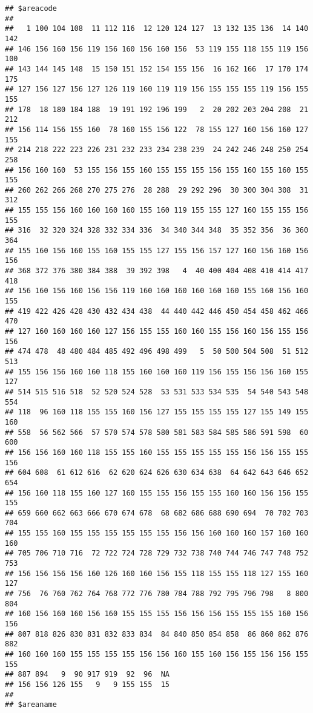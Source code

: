 \documentclass[]{article}
\begin{document}
\begin{verbatim}
## $areacode
## 
##   1 100 104 108  11 112 116  12 120 124 127  13 132 135 136  14 140 142 
## 146 156 160 156 119 156 160 156 160 156  53 119 155 118 155 119 156 100 
## 143 144 145 148  15 150 151 152 154 155 156  16 162 166  17 170 174 175 
## 127 156 127 156 127 126 119 160 119 119 156 155 155 155 119 156 155 155 
## 178  18 180 184 188  19 191 192 196 199   2  20 202 203 204 208  21 212 
## 156 114 156 155 160  78 160 155 156 122  78 155 127 160 156 160 127 155 
## 214 218 222 223 226 231 232 233 234 238 239  24 242 246 248 250 254 258 
## 156 160 160  53 155 156 155 160 155 155 155 156 155 160 155 160 155 155 
## 260 262 266 268 270 275 276  28 288  29 292 296  30 300 304 308  31 312 
## 155 155 156 160 160 160 160 155 160 119 155 155 127 160 155 155 156 155 
## 316  32 320 324 328 332 334 336  34 340 344 348  35 352 356  36 360 364 
## 155 160 156 160 155 160 155 155 127 155 156 157 127 160 156 160 156 156 
## 368 372 376 380 384 388  39 392 398   4  40 400 404 408 410 414 417 418 
## 156 160 156 160 156 156 119 160 160 160 160 160 160 155 160 156 160 155 
## 419 422 426 428 430 432 434 438  44 440 442 446 450 454 458 462 466 470 
## 127 160 160 160 160 127 156 155 155 160 160 155 156 160 156 155 156 156 
## 474 478  48 480 484 485 492 496 498 499   5  50 500 504 508  51 512 513 
## 155 156 156 160 160 118 155 160 160 160 119 156 155 156 156 160 155 127 
## 514 515 516 518  52 520 524 528  53 531 533 534 535  54 540 543 548 554 
## 118  96 160 118 155 155 160 156 127 155 155 155 155 127 155 149 155 160 
## 558  56 562 566  57 570 574 578 580 581 583 584 585 586 591 598  60 600 
## 156 156 160 160 118 155 155 160 155 155 155 155 155 156 156 155 155 156 
## 604 608  61 612 616  62 620 624 626 630 634 638  64 642 643 646 652 654 
## 156 160 118 155 160 127 160 155 155 156 155 155 160 160 156 156 155 155 
## 659 660 662 663 666 670 674 678  68 682 686 688 690 694  70 702 703 704 
## 155 155 160 155 155 155 155 155 155 156 156 160 160 160 157 160 160 160 
## 705 706 710 716  72 722 724 728 729 732 738 740 744 746 747 748 752 753 
## 156 156 156 156 160 126 160 160 156 155 118 155 155 118 127 155 160 127 
## 756  76 760 762 764 768 772 776 780 784 788 792 795 796 798   8 800 804 
## 160 156 160 160 156 160 155 155 155 156 156 156 155 155 155 160 156 156 
## 807 818 826 830 831 832 833 834  84 840 850 854 858  86 860 862 876 882 
## 160 160 160 155 155 155 155 156 156 160 155 160 156 155 156 156 155 155 
## 887 894   9  90 917 919  92  96  NA 
## 156 156 126 155   9   9 155 155  15 
## 
## $areaname

\end{verbatim}
\end{document}
